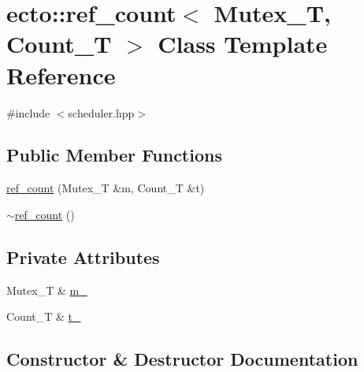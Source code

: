 \hypertarget{classecto_1_1ref__count}{}\section{ecto\+:\+:ref\+\_\+count$<$ Mutex\+\_\+T, Count\+\_\+T $>$ Class Template Reference}
\label{classecto_1_1ref__count}


{\ttfamily \#include $<$scheduler.\+hpp$>$}

\subsection*{Public Member Functions}
\begin{DoxyCompactItemize}
\item 
\hyperlink{classecto_1_1ref__count_a39fc7e105b142b7444a90dc6a3796828}{ref\+\_\+count} (Mutex\+\_\+T \&m, Count\+\_\+T \&t)
\item 
\hyperlink{classecto_1_1ref__count_a22b67e2d381344ff4c9b4c453bb47e23}{$\sim$ref\+\_\+count} ()
\end{DoxyCompactItemize}
\subsection*{Private Attributes}
\begin{DoxyCompactItemize}
\item 
Mutex\+\_\+T \& \hyperlink{classecto_1_1ref__count_a766db0f4309f593f6c3086a1ebead3a5}{m\+\_\+}
\item 
Count\+\_\+T \& \hyperlink{classecto_1_1ref__count_a689842816509f8f13710aee79b8c9898}{t\+\_\+}
\end{DoxyCompactItemize}


\subsection{Constructor \& Destructor Documentation}
